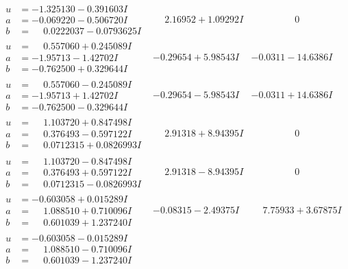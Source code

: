 \documentclass[1p]{elsarticle_modified}
\theoremstyle{definition}
\begin{document}
$$\begin{array}{c|c|c}
\begin{aligned}
u &= -1.325130 - 0.391603 I \\
a &= -0.069220 - 0.506720 I \\
b &= \phantom{-}0.0222037 - 0.0793625 I\end{aligned}
 & \phantom{-}2.16952 + 1.09292 I & \phantom{-0.000000 } 0 \\ \hline\begin{aligned}
u &= \phantom{-}0.557060 + 0.245089 I \\
a &= -1.95713 - 1.42702 I \\
b &= -0.762500 + 0.329644 I\end{aligned}
 & -0.29654 + 5.98543 I & -0.0311 - 14.6386 I \\ \hline\begin{aligned}
u &= \phantom{-}0.557060 - 0.245089 I \\
a &= -1.95713 + 1.42702 I \\
b &= -0.762500 - 0.329644 I\end{aligned}
 & -0.29654 - 5.98543 I & -0.0311 + 14.6386 I \\ \hline\begin{aligned}
u &= \phantom{-}1.103720 + 0.847498 I \\
a &= \phantom{-}0.376493 - 0.597122 I \\
b &= \phantom{-}0.0712315 + 0.0826993 I\end{aligned}
 & \phantom{-}2.91318 + 8.94395 I & \phantom{-0.000000 } 0 \\ \hline\begin{aligned}
u &= \phantom{-}1.103720 - 0.847498 I \\
a &= \phantom{-}0.376493 + 0.597122 I \\
b &= \phantom{-}0.0712315 - 0.0826993 I\end{aligned}
 & \phantom{-}2.91318 - 8.94395 I & \phantom{-0.000000 } 0 \\ \hline\begin{aligned}
u &= -0.603058 + 0.015289 I \\
a &= \phantom{-}1.088510 + 0.710096 I \\
b &= \phantom{-}0.601039 + 1.237240 I\end{aligned}
 & -0.08315 - 2.49375 I & \phantom{-}7.75933 + 3.67875 I \\ \hline\begin{aligned}
u &= -0.603058 - 0.015289 I \\
a &= \phantom{-}1.088510 - 0.710096 I \\
b &= \phantom{-}0.601039 - 1.237240 I\end{aligned}

\end{array}$$
\end{document}
